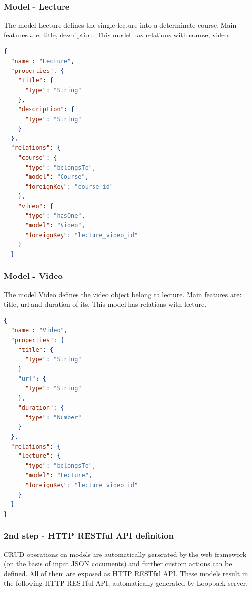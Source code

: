 \subsubsection{ Model - Lecture}

The model Lecture defines the single lecture into a determinate course. Main features are: title, description. This model has relations with course, video.


\begin{lstlisting}[language=json]
{
  "name": "Lecture",
  "properties": {
    "title": {
      "type": "String"
    },
    "description": {
      "type": "String"
    }
  },
  "relations": {
    "course": {
      "type": "belongsTo",
      "model": "Course",
      "foreignKey": "course_id"
    },
    "video": {
      "type": "hasOne",
      "model": "Video",
      "foreignKey": "lecture_video_id"
    }
  }

\end{lstlisting}

\subsubsection{ Model - Video}

The model Video defines the video object belong to lecture. Main features are: title, url and duration of its. This model has relations with lecture.


\begin{lstlisting}[language=json]
{
  "name": "Video",
  "properties": {
    "title": {
      "type": "String"
    }
    "url": {
      "type": "String"
    },
    "duration": {
      "type": "Number"
    }
  },
  "relations": {
    "lecture": {
      "type": "belongsTo",
      "model": "Lecture",
      "foreignKey": "lecture_video_id"
    }
  }
}

\end{lstlisting}


\subsubsection {2nd step - HTTP RESTful API definition}
\label{subsec:2nd_step_HTTP_RESTful_API_definition}

CRUD operations on models are automatically generated by the web framework (on the basis of input JSON documents) and further custom actions can be defined. All of them are exposed as HTTP RESTful API.
These models result in the following HTTP RESTful API, automatically generated by Loopback server.

